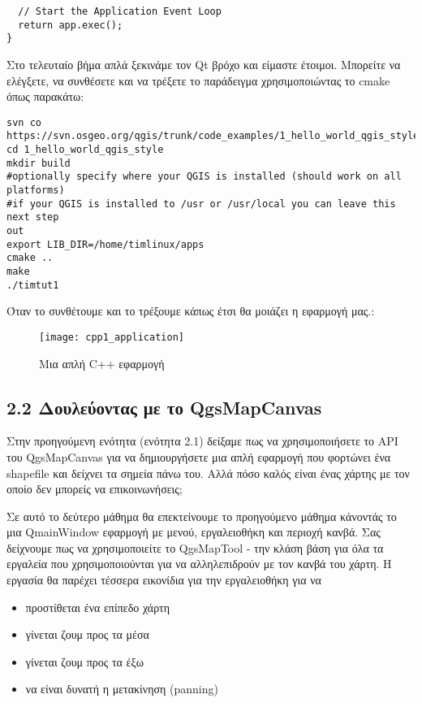 \begin{verbatim}
  // Start the Application Event Loop
  return app.exec();
}

\end{verbatim}

Στο τελευταίο βήμα απλά ξεκινάμε τον Qt βρόχο και είμαστε έτοιμοι. Μπορείτε να ελέγξετε, να συνθέσετε και να τρέξετε το παράδειγμα χρησιμοποιώντας το cmake όπως παρακάτω:

\begin{verbatim}
svn co
https://svn.osgeo.org/qgis/trunk/code_examples/1_hello_world_qgis_style
cd 1_hello_world_qgis_style
mkdir build
#optionally specify where your QGIS is installed (should work on all
platforms)
#if your QGIS is installed to /usr or /usr/local you can leave this next step
out
export LIB_DIR=/home/timlinux/apps
cmake ..
make
./timtut1
\end{verbatim}

Όταν το συνθέτουμε και το τρέξουμε κάπως έτσι θα μοιάζει η εφαρμογή μας.:

\begin{figure}[ht]
   \begin{center}
   \caption{Μια απλή C++ εφαρμογή \osxcaption}\label{fig:cpp1_application}\smallskip
   \texttt{[image: cpp1\_application]}
\end{center}
\end{figure}

\subsection{2.2 Δουλεύοντας με το QgsMapCanvas}

Στην προηγούμενη ενότητα (ενότητα 2.1) δείξαμε πως να χρησιμοποιήσετε το API του QgsMapCanvas για να δημιουργήσετε μια απλή εφαρμογή που φορτώνει ένα shapefile και δείχνει τα σημεία πάνω του. Αλλά πόσο καλός είναι ένας χάρτης με τον οποίο δεν μπορείς να επικοινωνήσεις; 

Σε αυτό το δεύτερο μάθημα θα επεκτείνουμε το προηγούμενο μάθημα κάνοντάς το μια QmainWindow εφαρμογή με μενού, εργαλειοθήκη και περιοχή κανβά.  Σας δείχνουμε πως να χρησιμοποιείτε το QgsMapTool - την κλάση βάση για όλα τα εργαλεία που χρησιμοποιούνται για να αλληλεπιδρούν με τον κανβά του χάρτη. Η εργασία θα παρέχει τέσσερα εικονίδια για την εργαλειοθήκη για να 

\begin{itemize}
 \item προστίθεται ένα επίπεδο χάρτη 
 \item γίνεται ζουμ προς τα μέσα
 \item γίνεται ζουμ προς τα έξω
 \item να είναι δυνατή η μετακίνηση (panning)
\end{itemize}

